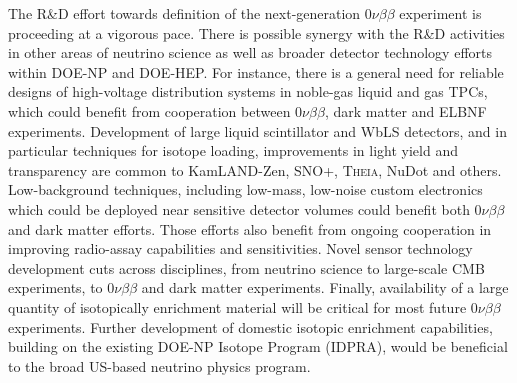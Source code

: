 The R\&D effort towards definition of the next-generation
$0\nu\beta\beta$ experiment is proceeding at a vigorous pace. There is
possible synergy with the R\&D activities in other areas of neutrino
science as well as broader detector technology efforts within DOE-NP
and DOE-HEP. For instance, there is a general need for reliable
designs of high-voltage distribution systems in noble-gas liquid and
gas TPCs, which could benefit from cooperation between
$0\nu\beta\beta$, dark matter and ELBNF experiments. Development of
large liquid scintillator and WbLS detectors, and in particular
techniques for isotope loading, improvements in light yield and
transparency are common to KamLAND-Zen, SNO+, \textsc{Theia}, NuDot
and others. Low-background techniques, including low-mass, low-noise
custom electronics which could be deployed near sensitive detector
volumes could benefit both $0\nu\beta\beta$  and dark matter
efforts. Those efforts also benefit from ongoing cooperation in
improving radio-assay capabilities and sensitivities. Novel sensor
technology development cuts across disciplines, from neutrino science
to large-scale CMB experiments, to $0\nu\beta\beta$ and dark matter
experiments. Finally, availability of a large quantity of isotopically
enrichment material will be critical for most future $0\nu\beta\beta$
experiments. Further development of domestic isotopic enrichment
capabilities, building on the existing DOE-NP Isotope Program (IDPRA),
would be beneficial to the broad US-based neutrino physics program.
